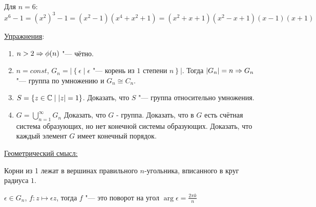 Для $n = 6$:
$$x^6 -1 = (x^2)^3 - 1 = (x^2 - 1)(x^4 + x^2 + 1) = (x^2 + x + 1)(x^2 - x + 1)(x - 1)(x + 1)$$

\underline{Упражнения}:
\begin{enumerate}
\item $n > 2 \Rightarrow \phi(n)$ "--- чётно.
\item $n = const$, $G_n = \left|\left\{\epsilon \mid \text{$\epsilon$ "--- корень из $1$ степени $n$}\right\}\right|$. Тогда $|G_n| = n \Rightarrow G_n$ "--- группа по умножению и $G_n \cong C_n$.
\item $S = \{z \in \mathbb{C} \mid |z| = 1\}$. Доказать, что $S$ "--- группа относительно умножения.
\item $G = \bigcup\limits_{n = 1}^{\infty} G_n$ Доказать, что $G$ - группа. Доказать, что в $G$ есть счётная система образующих, но нет конечной системы образующих. Доказать, что каждый элемент $G$ имеет конечный порядок. 
\end{enumerate}

\underline{Геометрический смысл:}
\begin{center}
\def\svgwidth{6.0cm}

\end{center}
Корни из 1 лежат в вершинах правильного $n$-угольника, вписанного в круг радиуса $1$.

$\epsilon \in G_n$, $f\colon z \mapsto \epsilon z$, тогда $f$ "--- это поворот на угол $\arg \epsilon = \frac{2 \pi k}n$